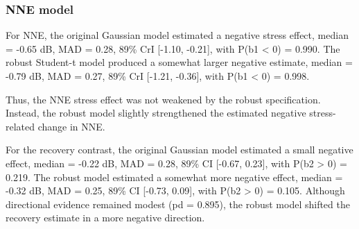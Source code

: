 \documentclass[
  english,
  man,floatsintext]{apa6}
\begin{document}
\subsubsection{NNE model}\label{nne-model}

For NNE, the original Gaussian model estimated a negative stress effect, median = -0.65 dB, MAD = 0.28, 89\% CrI {[}-1.10, -0.21{]}, with P(b1 \textless{} 0) = 0.990. The robust Student-t model produced a somewhat larger negative estimate, median = -0.79 dB, MAD = 0.27, 89\% CrI {[}-1.21, -0.36{]}, with P(b1 \textless{} 0) = 0.998.

Thus, the NNE stress effect was not weakened by the robust specification. Instead, the robust model slightly strengthened the estimated negative stress-related change in NNE.

For the recovery contrast, the original Gaussian model estimated a small negative effect, median = -0.22 dB, MAD = 0.28, 89\% CI {[}-0.67, 0.23{]}, with P(b2 \textgreater{} 0) = 0.219. The robust model estimated a somewhat more negative effect, median = -0.32 dB, MAD = 0.25, 89\% CI {[}-0.73, 0.09{]}, with P(b2 \textgreater{} 0) = 0.105. Although directional evidence remained modest (pd = 0.895), the robust model shifted the recovery estimate in a more negative direction.
\end{document}
